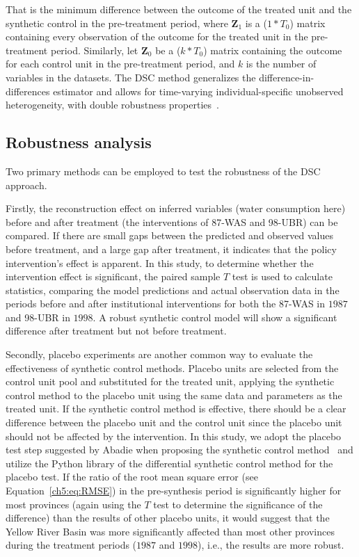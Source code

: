 \documentclass[preprint, 12pt]{elsarticle}
\begin{document}
That is the minimum difference between the outcome of the treated unit and the synthetic control in the pre-treatment period, where $\mathbf{Z}_{1}$ is a ($1*T_0$) matrix containing every observation of the outcome for the treated unit in the pre-treatment period. Similarly, let $\mathbf{Z}_{0}$ be a ($k * T_0$) matrix containing the outcome for each control unit in the pre-treatment period, and $k$ is the number of variables in the datasets.
The DSC method generalizes the difference-in-differences estimator and allows for time-varying individual-specific unobserved heterogeneity, with double robustness properties~\cite{billmeier2013, smith2015}.

\subsection{Robustness analysis}\label{sec:robustness}

Two primary methods can be employed to test the robustness of the DSC approach.

Firstly, the reconstruction effect on inferred variables (water consumption here) before and after treatment (the interventions of 87-WAS and 98-UBR) can be compared.
If there are small gaps between the predicted and observed values before treatment, and a large gap after treatment, it indicates that the policy intervention's effect is apparent.
In this study, to determine whether the intervention effect is significant, the paired sample $T$ test is used to calculate statistics, comparing the model predictions and actual observation data in the periods before and after institutional interventions for both the 87-WAS in $1987$ and 98-UBR in $1998$.
A robust synthetic control model will show a significant difference after treatment but not before treatment.

Secondly, placebo experiments are another common way to evaluate the effectiveness of synthetic control methods.
Placebo units are selected from the control unit pool and substituted for the treated unit, applying the synthetic control method to the placebo unit using the same data and parameters as the treated unit.
If the synthetic control method is effective, there should be a clear difference between the placebo unit and the control unit since the placebo unit should not be affected by the intervention.
In this study, we adopt the placebo test step suggested by Abadie when proposing the synthetic control method~\cite{abadie2010} and utilize the Python library of the differential synthetic control method for the placebo test.
If the ratio of the root mean square error (see Equation~\ref{ch5:eq:RMSE}) in the pre-synthesis period is significantly higher for most provinces (again using the $T$ test to determine the significance of the difference) than the results of other placebo units, it would suggest that the Yellow River Basin was more significantly affected than most other provinces during the treatment periods ($1987$ and $1998$), i.e., the results are more robust.
\end{document}
